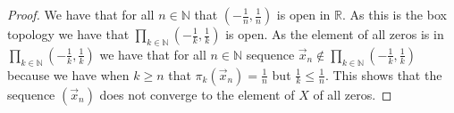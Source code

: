 \documentclass{amsart}
\theoremstyle{plain}
\theoremstyle{definition}
\theoremstyle{remark}
\begin{document}
 \begin{proof}
    We have that for all $n\in \mathbb{N}$ that $(-\frac{1}{n},\frac{1}{n})$ is open in $\mathbb{R}$. As this is the box topology we have that $\prod_{k\in\mathbb{N}}(-\frac{1}{k},\frac{1}{k})$ is open. As the element of all zeros is in $\prod_{k\in\mathbb{N}}(-\frac{1}{k},\frac{1}{k})$ we have that for all $n \in \mathbb{N}$ sequence $\vec{x}_n\not \in  \prod_{k\in\mathbb{N}}(-\frac{1}{k},\frac{1}{k})$ because we have when $k\geq n$ that $\pi_k(\vec{x}_n)=\frac{1}{n}$ but $\frac{1}{k}\leq \frac{1}{n}$. This shows that the sequence $(\vec{x}_n)$ does not converge to the element of $X$ of all zeros.

 \end{proof}

 
\end{document}
